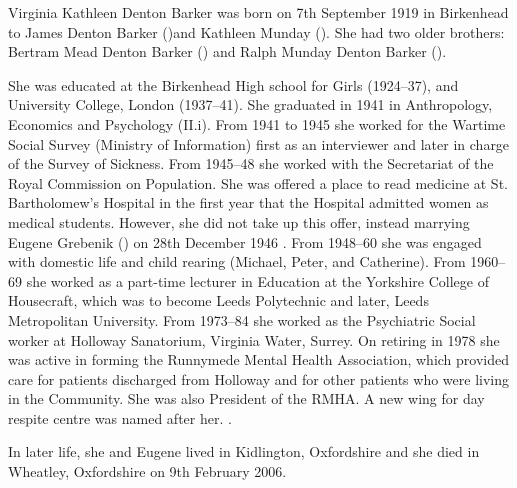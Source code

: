 
Virginia Kathleen Denton Barker was born on 7th September 1919 \cite{VKDBarkerManuscript} in Birkenhead to James Denton Barker ()and Kathleen Munday ().  She had two older brothers:  Bertram Mead Denton Barker () and Ralph Munday Denton Barker (). 

She was educated at the Birkenhead High school for Girls (1924--37), and University College, London (1937--41). She graduated in 1941 in Anthropology, Economics and Psychology (II.i). From 1941 to 1945 she worked for the Wartime Social Survey (Ministry of Information) first as an interviewer and later in charge of the Survey of Sickness. From 1945--48 she worked with the Secretariat of the Royal Commission on Population. She was offered a place to read medicine at St. Bartholomew's Hospital in the first year that the Hospital admitted women as medical students. However, she did not take up this offer, instead marrying Eugene Grebenik () on 28th December 1946 \cite{VKDBarkerManuscript}. From 1948--60 she was engaged with domestic life and child rearing (Michael, Peter, and Catherine). From 1960--69 she worked as a part-time lecturer in Education at the Yorkshire College of Housecraft, which was to become Leeds Polytechnic and later, Leeds Metropolitan University. From 1973--84 she worked as the Psychiatric Social worker at Holloway Sanatorium, Virginia Water, Surrey. On retiring in 1978 she was active in forming the Runnymede Mental Health Association, which provided care for patients discharged from Holloway and for other patients who were living in the Community. She was also President of the RMHA. A new wing for day respite centre was named after her. \cite{VirginiaDocs}.

In later life, she and Eugene lived in Kidlington, Oxfordshire and she died in Wheatley, Oxfordshire  on 9th February 2006.
